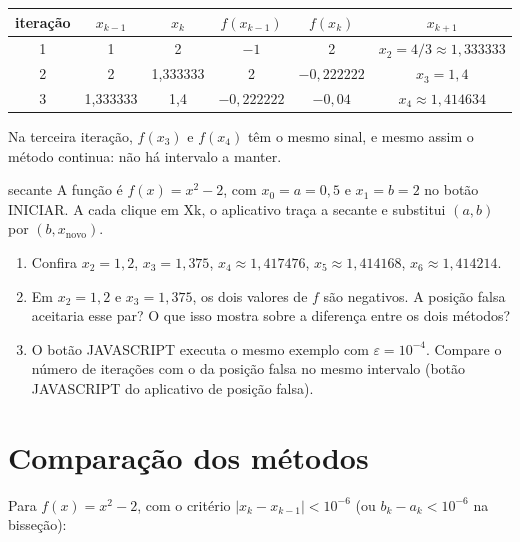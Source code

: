 \begin{exemplo}[{: três iterações para $f(x)=x^2-2$ com $x_0=1$, $x_1=2$}]
\begin{center}
\begin{tabular}{cccccc}
\toprule
iteração & $x_{k-1}$ & $x_k$ & $f(x_{k-1})$ & $f(x_k)$ & $x_{k+1}$\\
\midrule
1 & 1 & 2 & $-1$ & 2 & $x_2=4/3\approx1{,}333333$\\
2 & 2 & 1{,}333333 & 2 & $-0{,}222222$ & $x_3=1{,}4$\\
3 & 1{,}333333 & 1{,}4 & $-0{,}222222$ & $-0{,}04$ & $x_4\approx1{,}414634$\\
\bottomrule
\end{tabular}
\end{center}
Na terceira iteração, $f(x_3)$ e $f(x_4)$ têm o mesmo sinal, e mesmo assim o método continua:
não há intervalo a manter.
\end{exemplo}

\begin{atividade}{secante}{\arqSec}
A função é $f(x)=x^2-2$, com $x_0=a=0{,}5$ e $x_1=b=2$ no botão INICIAR. A cada clique em Xk,
o aplicativo traça a secante e substitui $(a,b)$ por $(b,x_{\text{novo}})$.
\begin{enumerate}[nosep]
  \item Confira $x_2=1{,}2$, $x_3=1{,}375$, $x_4\approx1{,}417476$, $x_5\approx1{,}414168$,
        $x_6\approx1{,}414214$.
  \item Em $x_2=1{,}2$ e $x_3=1{,}375$, os dois valores de $f$ são negativos. A posição falsa
        aceitaria esse par? O que isso mostra sobre a diferença entre os dois métodos?
  \item O botão JAVASCRIPT executa o mesmo exemplo com $\varepsilon=10^{-4}$. Compare o número de
        iterações com o da posição falsa no mesmo intervalo (botão JAVASCRIPT do aplicativo de
        posição falsa).
\end{enumerate}
\end{atividade}

\section{Comparação dos métodos}

Para $f(x)=x^2-2$, com o critério $|x_k-x_{k-1}|<10^{-6}$ (ou $b_k-a_k<10^{-6}$ na bisseção):

